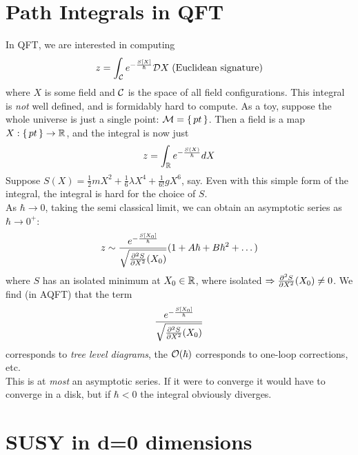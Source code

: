 \documentclass{article}
\begin{document}
\section{Path Integrals in QFT}
In QFT, we are interested in computing 
\[
z = \int_\mc{C} e^{-\frac{S[X]}{\hbar}} \mc{D}X \; \text{(Euclidean signature)}
\]
where $X$ is some field and $\mc{C}$ is the space of all field configurations. This integral is \emph{not} well defined, and is formidably hard to compute. 
As a toy, suppose the whole universe is just a single point: $\mc{M} = \set{pt}$. Then a field is a map $X:\set{pt} \to \mbb{R}$, and the integral is now just 
\[
z = \int_\mbb{R} e^{-\frac{S(X)}{\hbar}} dX
\]
Suppose $S(X) = \frac{1}{2}mX^2 + \frac{1}{6}\lambda X^4 +\frac{1}{6!} gX^6$, say. Even with this simple form of the integral, the integral is hard for the choice of $S$. \\
As $\hbar \to 0$, taking the semi classical limit, we can obtain an asymptotic series as $\hbar \to 0^+$: 
\[
z \sim \frac{e^{-\frac{S[X_0]}{\hbar}}}{\sqrt{\pds[S]{X}(X_0)}}(1+A\hbar + B\hbar^2+\dots)
\]
where $S$ has an isolated minimum at $X_0\in\mbb{R}$, where isolated $\Rightarrow \pds[S]{X}(X_0) \neq0$. We find (in AQFT) that the term \[
\frac{e^{-\frac{S[X_0]}{\hbar}}}{\sqrt{\pds[S]{X}(X_0)}}
\]
corresponds to \emph{tree level diagrams}, the $\mc{O}(\hbar)$ corresponds to one-loop corrections, etc. \\
This is at \emph{most} an asymptotic series. If it were to converge it would have to converge in a disk, but if $\hbar < 0$ the integral obviously diverges. 

\section{SUSY in d=0 dimensions}
\end{document}

